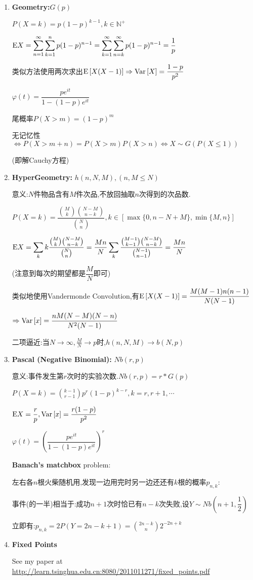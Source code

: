 \begin{enumerate}
    \item \textbf{Geometry:}$ G(p)$

      $ P(X=k) = p(1-p)^{k-1}, k \in \mathbb{N^+}$

      $ \Ex{X} = \sum_{n=1}^{\infty}\sum_{k=1}^{n}{p(1-p)^{n-1}}=
      \sum_{k=1}^{\infty}\sum_{n=k}^{\infty}{p(1-p)^{n-1}}= \dfrac{1}{p}$

      类似方法使用两次求出$ \text{E}\left[X(X-1)\right]\Rightarrow \text{Var}\left[X\right] = \dfrac{1-p}{p^2}$

      $ \varphi(t) = \dfrac{pe^{it}}{1-(1-p)e^{it}}$

      尾概率$ P(X>m) = (1-p)^m$

      无记忆性 $\Leftrightarrow P(X>m+n) = P(X>m)P(X>n)\Leftrightarrow X\sim G(P(X\le 1)) $

          (即解Cauchy方程)

        \item \textbf{HyperGeometry:} $ h(n,N,M),(n, M\le N)$

          意义:$ N$件物品含有$ M$件次品,不放回抽取$ n$次得到的次品数.

          $ P(X=k) = \dfrac{{M\choose{k}} {{N-M}\choose{{n-k}}} }{{N\choose{n}} }, k \in [\max\{0, n-N + M\}, \min\{M,n\}]$

          $ \Ex{X} = \sum_{k}k\dfrac{{M\choose{k}}{{N-M}\choose{n-k}}}{{N\choose{n}}}  = \dfrac{Mn}{N}\sum_{k}\dfrac{{{M-1}\choose{k-1}}{{N-M}\choose{n-k}}}{{{N-1}\choose{n-1}}} = \dfrac{Mn}{N}$

          (注意到每次的期望都是$ \dfrac{M}{N}$即可)

          类似地使用Vandermonde Convolution,有$ 	\text{E}\left[X(X-1)\right] = \dfrac{M(M-1)n(n-1)}{N(N-1)}$

          $\Rightarrow \text{Var}\left[x\right]  = \dfrac{nM(N-M)(N-n)}{N^2(N-1)} $

        二项逼近:当$N\to\infty, \frac{M}{N}\to p $时,$ h(n,N,M)\to b(N,p)$

      \item \textbf{Pascal (Negative Binomial):} $ Nb(r,p)$

        意义:事件发生第$ r$次时的实验次数.$ Nb(r, p) = r * G(p) $

        $ P(X = k) = {{k-1}\choose{r-1}} p^r(1-p)^{k-r}, k = r,r+1,\cdots$

        $ \text{E}X = \dfrac{r}{p}, \text{Var}\left[x\right] = \dfrac{r(1-p)}{p^2}$

        $ \varphi(t) = (\dfrac{pe^{it}}{1-(1-p)e^{it}})^r$

        \textbf{Banach's matchbox} problem:

        左右各$ n$根火柴随机用,发现一边用完时另一边还还有$ k$根的概率$ p_{n,k}$:

        事件(的一半)相当于:成功$ n+1$次时恰已有$ n-k$次失败,设$ Y\sim Nb(n+1, \dfrac{1}{2})$

        立即有:$ p_{n,k} = 2P(Y = 2n-k+1) = {{2n-k}\choose{n}} 2^{-2n+k}$

      \item \textbf{Fixed Points}

        See my paper at \url{http://learn.tsinghua.edu.cn:8080/2011011271/fixed_points.pdf}

    \end{enumerate}

